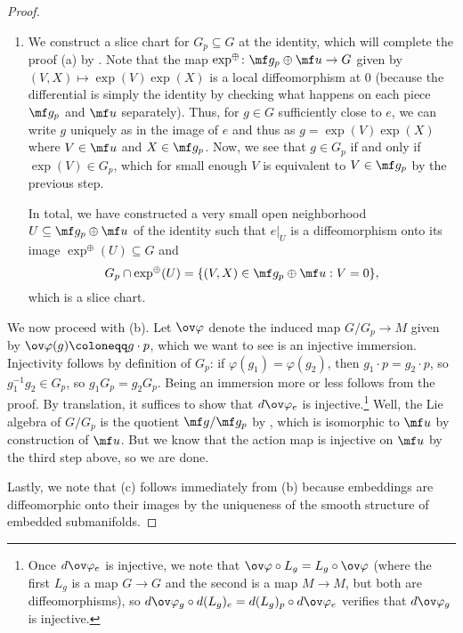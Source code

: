 \documentclass[../notes.tex]{subfiles}
\begin{document}
\begin{proof}
\begin{enumerate}
		\item We construct a slice chart for $G_p\subseteq G$ at the identity, which will complete the proof (a) by . Note that the map $\exp^\oplus\colon\mf g_p\oplus\mf u\to G$ given by $(V,X)\mapsto\exp(V)\exp(X)$ is a local diffeomorphism at $0$ (because the differential is simply the identity by checking what happens on each piece $\mf g_p$ and $\mf u$ separately). Thus, for $g\in G$ sufficiently close to $e$, we can write $g$ uniquely as in the image of $e$ and thus as $g=\exp(V)\exp(X)$ where $V\in\mf u$ and $X\in\mf g_p$. Now, we see that $g\in G_p$ if and only if $\exp(V)\in G_p$, which for small enough $V$ is equivalent to $V\in\mf g_p$ by the previous step.

		In total, we have constructed a very small open neighborhood $U\subseteq\mf g_p\oplus\mf u$ of the identity such that $e|_U$ is a diffeomorphism onto its image $\exp^\oplus(U)\subseteq G$ and
		\[G_p\cap\exp^\oplus(U)=\{(V,X)\in\mf g_p\oplus\mf u:V=0\},\]
		which is a slice chart.

		
	\end{enumerate}
	We now proceed with (b). Let $\ov\varphi$ denote the induced map $G/G_p\to M$ given by $\ov\varphi(g)\coloneqq g\cdot p$, which we want to see is an injective immersion. Injectivity follows by definition of $G_p$: if $\varphi(g_1)=\varphi(g_2)$, then $g_1\cdot p=g_2\cdot p$, so $g_1^{-1}g_2\in G_p$, so $g_1G_p=g_2G_p$. Being an immersion more or less follows from the proof. By translation, it suffices to show that $d\ov\varphi_e$ is injective.\footnote{Once $d\ov\varphi_e$ is injective, we note that $\ov\varphi\circ L_g=L_g\circ\ov\varphi$ (where the first $L_g$ is a map $G\to G$ and the second is a map $M\to M$, but both are diffeomorphisms), so $d\ov\varphi_g\circ d(L_g)_e=d(L_g)_{p}\circ d\ov\varphi_e$ verifies that $d\ov\varphi_g$ is injective.} Well, the Lie algebra of $G/G_p$ is the quotient $\mf g/\mf g_p$ by , which is isomorphic to $\mf u$ by construction of $\mf u$. But we know that the action map is injective on $\mf u$ by the third step above, so we are done.

	Lastly, we note that (c) follows immediately from (b) because embeddings are diffeomorphic onto their images by the uniqueness of the smooth structure of embedded submanifolds.
\end{proof}
\end{document}
